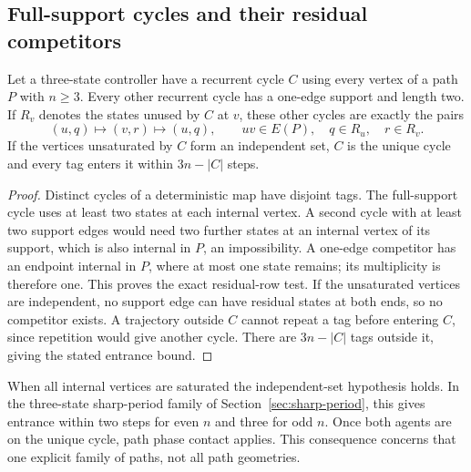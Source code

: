 \subsection{Full-support cycles and their residual competitors}
\label{app:basins}
\begin{proposition}\label{prop:residual-cycles}
Let a three-state controller have a recurrent cycle $C$ using every vertex of a
path $P$ with $n\ge3$. Every other recurrent cycle has a one-edge support and
length two. If $R_v$ denotes the states unused by $C$ at $v$, these other cycles
are exactly the pairs
\[
 (u,q)\longmapsto(v,r)\longmapsto(u,q),\qquad
 uv\in E(P),\quad q\in R_u,\quad r\in R_v.
\]
If the vertices unsaturated by $C$ form an independent set, $C$ is the unique
cycle and every tag enters it within $3n-|C|$ steps.
\end{proposition}
\begin{proof}
Distinct cycles of a deterministic map have disjoint tags. The full-support
cycle uses at least two states at each internal vertex. A second cycle with
at least two support edges would need two further states at an internal vertex
of its support, which is also internal in $P$, an impossibility. A one-edge
competitor has an endpoint internal in $P$, where at most one state remains;
its multiplicity is therefore one. This proves the exact residual-row test.
If the unsaturated vertices are independent, no support edge can have residual
states at both ends, so no competitor exists. A trajectory outside $C$ cannot
repeat a tag before entering $C$, since repetition would give another cycle.
There are $3n-|C|$ tags outside it, giving the stated entrance bound.
\end{proof}
When all internal vertices are saturated the independent-set hypothesis holds.
In the three-state sharp-period family of Section~\ref{sec:sharp-period}, this
gives entrance within two steps for even $n$ and three for odd $n$. Once both
agents are on the unique cycle, path phase contact applies. This consequence
concerns that one explicit family of paths, not all path geometries.

